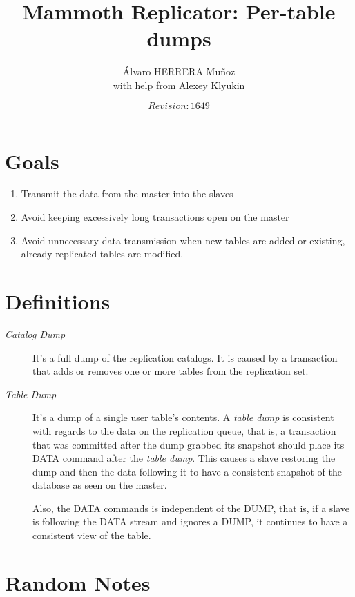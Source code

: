 \documentclass{article}
\author{Álvaro HERRERA Muñoz \\ with help from Alexey Klyukin}
\title{Mammoth Replicator: Per-table dumps}
\date{$Revision: 1649 $}
\newcommand{\Catdump}{\emph{Catalog Dump}}
\newcommand{\tabdump}{\emph{table dump}}
\newcommand{\Tabdump}{\emph{Table Dump}}
\begin{document}
\maketitle

\section{Goals}

\begin{enumerate}

\item Transmit the data from the master into the slaves

\item Avoid keeping excessively long transactions open on the master

\item Avoid unnecessary data transmission
when new tables are added or
existing, already-replicated tables are modified.

\end{enumerate}

\section{Definitions}

\begin{description}

\item[\Catdump] It's a full dump of the replication catalogs.
It is caused by a transaction
that adds or removes one or more tables
from the replication set.

\item[\Tabdump] It's a dump of a single user table's contents.
A \tabdump{} is consistent with regards to the data on the replication queue,
that is,
a transaction that was committed after the dump grabbed its snapshot
should place its DATA command after the \tabdump.
This causes a slave restoring the dump
and then the data following it
to have a consistent snapshot of the database
as seen on the master.

Also,
the DATA commands is independent of the DUMP,
that is, if a slave is following the DATA stream
and ignores a DUMP,
it continues to have a consistent view of the table.

\end{description}

\section{Random Notes}
\end{document}
